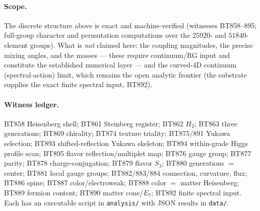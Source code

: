 \documentclass[11pt]{article}
\begin{document}
\paragraph{Scope.} The discrete structure above is exact and
machine-verified (witnesses BT858--895; full-group character and
permutation computations over the $25920$- and $51840$-element groups).
What is \emph{not} claimed here: the coupling magnitudes, the precise
mixing angles, and the masses --- these require continuum/RG input and
constitute the established numerical layer --- and the curved-$4$D
continuum (spectral-action) limit, which remains the open analytic
frontier (the substrate supplies the exact finite spectral input,
BT892).

\paragraph{Witness ledger.} BT858 Heisenberg shell; BT861 Steinberg
register; BT862 $H_2$; BT863 three generations; BT869 chirality; BT874
texture triality; BT875/891 Yukawa selection; BT893 shifted-reflection
Yukawa skeleton; BT894 within-grade Higgs profile scan; BT895 flavor
reflection/multiplet map; BT876 gauge group; BT877 parity; BT878
charge-conjugation; BT879 flavor $S_3$; BT880 generations $=$ center;
BT881 local gauge groups; BT882/883/884 connection, curvature, flux;
BT886 spine; BT887 color/electroweak; BT888 color $=$ matter Heisenberg;
BT889 fermion content; BT890 matter cone/$E_7$; BT892 finite spectral
input. Each has an executable script in \texttt{analysis/} with JSON
results in \texttt{data/}.
\end{document}

